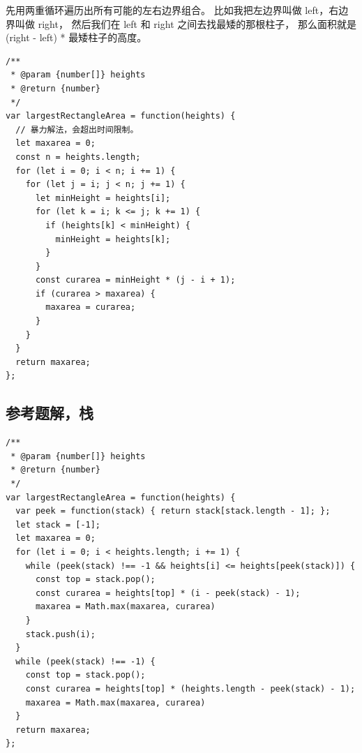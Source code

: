 先用两重循环遍历出所有可能的左右边界组合。
比如我把左边界叫做 left，右边界叫做 right，
然后我们在 left 和 right 之间去找最矮的那根柱子，
那么面积就是 (right - left) * 最矮柱子的高度。

\begin{verbatim}
/**
 * @param {number[]} heights
 * @return {number}
 */
var largestRectangleArea = function(heights) {
  // 暴力解法，会超出时间限制。
  let maxarea = 0;
  const n = heights.length;
  for (let i = 0; i < n; i += 1) {
    for (let j = i; j < n; j += 1) {
      let minHeight = heights[i];
      for (let k = i; k <= j; k += 1) {
        if (heights[k] < minHeight) {
          minHeight = heights[k];
        }
      }
      const curarea = minHeight * (j - i + 1);
      if (curarea > maxarea) {
        maxarea = curarea;
      }
    }
  }
  return maxarea;
};
\end{verbatim}

\subsection{参考题解，栈}

\begin{verbatim}
/**
 * @param {number[]} heights
 * @return {number}
 */
var largestRectangleArea = function(heights) {
  var peek = function(stack) { return stack[stack.length - 1]; };
  let stack = [-1];
  let maxarea = 0;
  for (let i = 0; i < heights.length; i += 1) {
    while (peek(stack) !== -1 && heights[i] <= heights[peek(stack)]) {
      const top = stack.pop();
      const curarea = heights[top] * (i - peek(stack) - 1);
      maxarea = Math.max(maxarea, curarea)
    }
    stack.push(i);
  }
  while (peek(stack) !== -1) {
    const top = stack.pop();
    const curarea = heights[top] * (heights.length - peek(stack) - 1);
    maxarea = Math.max(maxarea, curarea)
  }
  return maxarea;
};
\end{verbatim}
